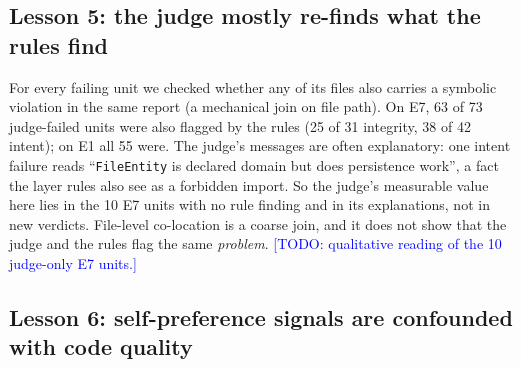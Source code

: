\documentclass[10pt,a4paper]{article}
\newcommand{\todo}[1]{\textcolor{blue}{[TODO: #1]}}
\begin{document}
\subsection{Lesson 5: the judge mostly re-finds what the rules find}\label{sec:l5}

For every failing unit we checked whether any of its files also carries a symbolic violation in the same report (a
mechanical join on file path). On E7, 63 of 73 judge-failed units were also flagged by the rules (25 of 31 integrity,
38 of 42 intent); on E1 all 55 were.
The judge's messages are often explanatory: one intent failure reads ``\texttt{FileEntity} is declared domain but
does persistence work'', a fact the layer rules also see as a forbidden import.
So the judge's measurable value here lies in the 10 E7 units with no rule finding and in its explanations, not in
new verdicts. File-level co-location is a coarse join, and it does not show that the judge and the rules flag the
same \emph{problem}. \todo{qualitative reading of the 10 judge-only E7 units.}

\subsection{Lesson 6: self-preference signals are confounded with code quality}\label{sec:l6}
\end{document}
